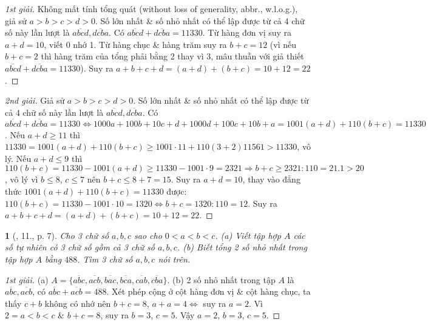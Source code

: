 \documentclass{article}
\newtheorem{baitoan}{}
\begin{document}
\begin{proof}[1st giải]
	Không mất tính tổng quát (without loss of generality, abbr., w.l.o.g.), giả sử $a > b > c > d > 0$. Số lớn nhất \& số nhỏ nhất có thể lập được từ cả 4 chữ số này lần lượt là $\overline{abcd},\overline{dcba}$. Có $\overline{abcd} + \overline{dcba} = 11330$. Từ hàng đơn vị suy ra $a + d = 10$, viết 0 nhớ 1. Từ hàng chục \& hàng trăm suy ra $b + c = 12$ (vì nếu $b + c = 2$ thì hàng trăm của tổng phải bằng 2 thay vì 3, mâu thuẫn với giả thiết $\overline{abcd} + \overline{dcba} = 11330$). Suy ra $a + b + c + d = (a + d) + (b + c) = 10 + 12 = 22$.
\end{proof}

\begin{proof}[2nd giải]
	Giả sử $a > b > c > d > 0$. Số lớn nhất \& số nhỏ nhất có thể lập được từ cả 4 chữ số này lần lượt là $\overline{abcd},\overline{dcba}$. Có $\overline{abcd} + \overline{dcba} = 11330\Leftrightarrow1000a + 100b + 10c + d + 1000d + 100c + 10b + a = 1001(a + d) + 110(b + c) = 11330$. Nếu $a + d\ge11$ thì $11330 = 1001(a + d) + 110(b + c)\ge1001\cdot11 + 110(3 + 2) 11561 > 11330$, vô lý. Nếu $a + d\le9$ thì $110(b + c) = 11330 - 1001(a + d)\ge11330 - 1001\cdot9 = 2321\Rightarrow b + c\ge2321:110 = 21.1 > 20$, vô lý vì $b\le8$, $c\le7$ nên $b + c\le 8 + 7 = 15$. Suy ra $a + d = 10$, thay vào đẳng thức $1001(a + d) + 110(b + c) = 11330$ được: $110(b + c) = 11330 - 1001\cdot10 = 1320\Leftrightarrow b + c = 1320:110 = 12$. Suy ra $a + b + c + d = (a + d) + (b + c) = 10 + 12 = 22$.
\end{proof}

\begin{baitoan}[\cite{Binh_Toan_6_tap_1}, 11., p. 7]
	Cho 3 chữ số $a,b,c$ sao cho $0 < a < b < c$. (a) Viết tập hợp $A$ các số tự nhiên có 3 chữ số gồm cả 3 chữ số $a,b,c$. (b) Biết tổng 2 số nhỏ nhất trong tập hợp $A$ bằng $488$. Tìm 3 chữ số $a,b,c$ nói trên.
\end{baitoan}

\begin{proof}[1st giải]
	(a) $A = \{\overline{abc},\overline{acb},\overline{bac},\overline{bca},\overline{cab},\overline{cba}\}$. (b) 2 số nhỏ nhất trong tập $A$ là $\overline{abc},\overline{acb}$, có $\overline{abc} + \overline{acb} = 488$. Xét phép cộng ở cột hàng đơn vị \& cột hàng chục, ta thấy $c + b$ không có nhớ nên $b + c = 8$, $a + a = 4\Leftrightarrow$ suy ra $a = 2$. Vì $2 = a < b < c$ \& $b + c = 8$, suy ra $b = 3$, $c = 5$. Vậy $a = 2$, $b = 3$, $c = 5$.
\end{proof}
\end{document}
